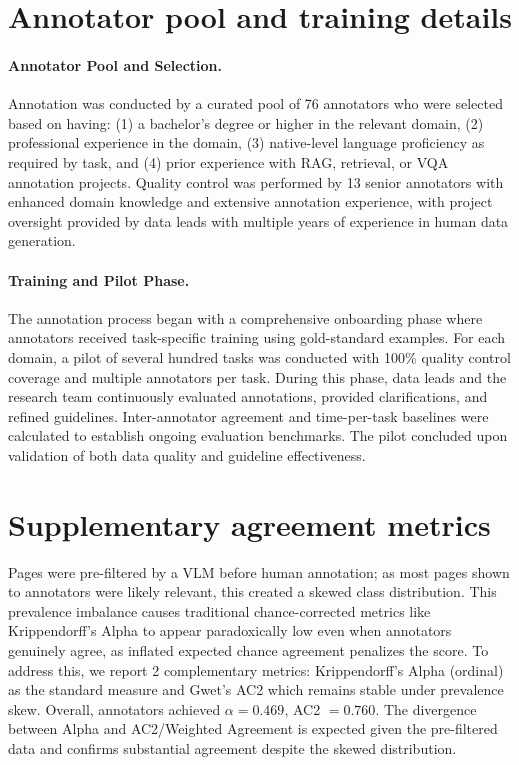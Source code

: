 \section{Annotator pool and training details}
\label{vidorev3:appendix: annotator pool}
\paragraph{Annotator Pool and Selection.} Annotation was conducted by a curated pool of 76 annotators who were selected based on having: (1) a bachelor's degree or higher in the relevant domain, (2) professional experience in the domain, (3) native-level language proficiency as required by task, and (4) prior experience with RAG, retrieval, or VQA annotation projects. Quality control was performed by 13 senior annotators with enhanced domain knowledge and extensive annotation experience, with project oversight provided by data leads with multiple years of experience in human data generation.

\paragraph{Training and Pilot Phase.} The annotation process began with a comprehensive onboarding phase where annotators received task-specific training using gold-standard examples. For each domain, a pilot of several hundred tasks was conducted with 100\% quality control coverage and multiple annotators per task. During this phase, data leads and the research team continuously evaluated annotations, provided clarifications, and refined guidelines. Inter-annotator agreement and time-per-task baselines were calculated to establish ongoing evaluation benchmarks. The pilot concluded upon validation of both data quality and guideline effectiveness.

\section{Supplementary agreement metrics}
\label{vidorev3:appendix: relevance agreement}

Pages were pre-filtered by a VLM before human annotation; as most pages shown to annotators were likely relevant, this created a skewed class distribution. This prevalence imbalance causes traditional chance-corrected metrics like Krippendorff's Alpha to appear paradoxically low even when annotators genuinely agree, as inflated expected chance agreement penalizes the score. To address this, we report 2 complementary metrics: Krippendorff's Alpha (ordinal) as the standard measure and Gwet's AC2 which remains stable under prevalence skew. Overall, annotators achieved $\alpha = 0.469$, AC2 $= 0.760$. The divergence between Alpha and AC2/Weighted Agreement is expected given the pre-filtered data and confirms substantial agreement despite the skewed distribution.

